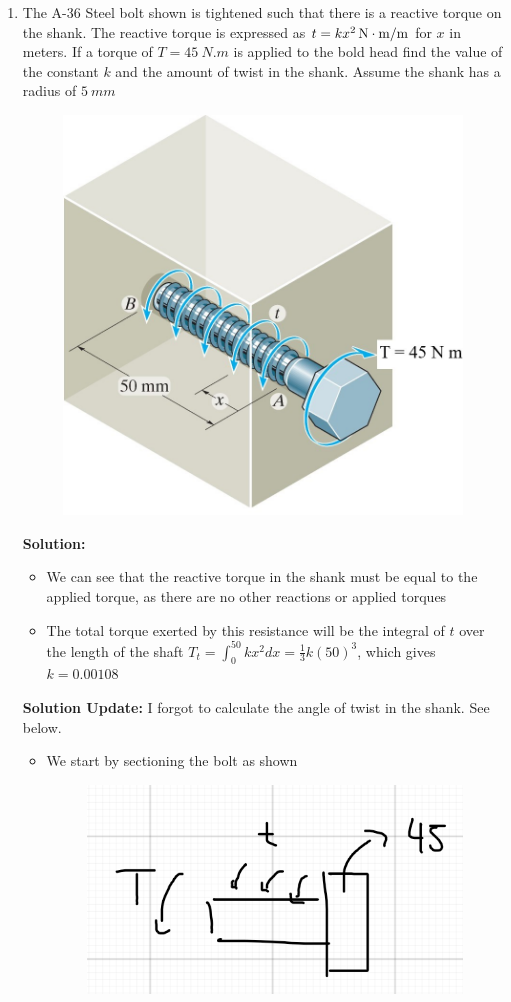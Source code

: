 \documentclass[12pt, oneside]{article}
\begin{document}
\begin{enumerate}
	\item %
		The A-36 Steel bolt shown is tightened such that there is a reactive torque on the shank.
		The reactive torque is expressed as $t = \SI[number-math-rm = \mathnormal, parse-numbers = false]{kx^2 }{N.m/m}$ for $x$ in meters.
		If a torque of $T=\SI{45 }{N.m}$ is applied to the bold head find the value of the constant $k$ and the amount of twist in the shank.
		Assume the shank has a radius of $\SI{5 }{mm}$
		\begin{figure}[H]
			\centering
			\includegraphics[width=0.6\linewidth]{5-69}
		\end{figure}
		\textbf{Solution:}
		\begin{itemize}
			\item We can see that the reactive torque in the shank must be equal to the applied torque, as there are no other reactions or applied torques
			\item The total torque exerted by this resistance will be the integral of $t$ over the length of the shaft $T_t = \int_0^{50} kx^2 dx = \frac{1}{3}k (50)^3$, which gives $k = 0.00108$
		\end{itemize}
		\textbf{Solution Update:} I forgot to calculate the angle of twist in the shank. See below.
		\begin{itemize}
			\item We start by sectioning the bolt as shown
				\begin{figure}[H]
					\centering
					\includegraphics[width=0.6\linewidth]{4-4}

\end{figure}
\end{itemize}
\end{enumerate}
\end{document}
